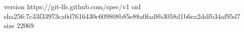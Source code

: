 version https://git-lfs.github.com/spec/v1
oid sha256:7c33f33973ca0d7616430c609808b85e88a0fad8b3058d1b6ea2ddfb34af95d7
size 22069
